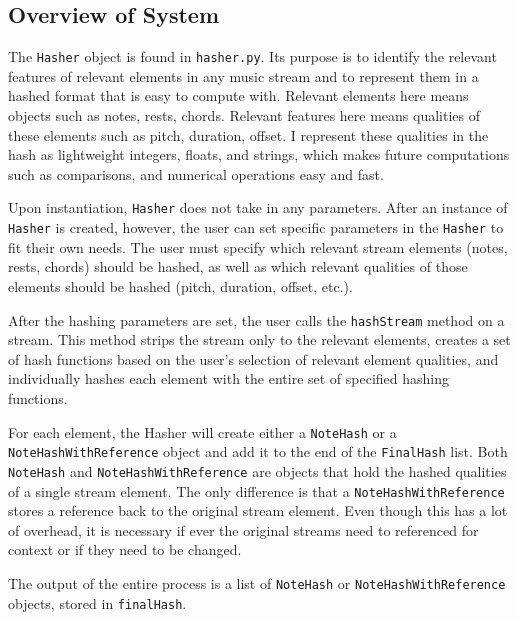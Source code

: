\subsection{Overview of System}
The \texttt{Hasher} object is found in \texttt{hasher.py}. Its purpose is to identify the relevant features of relevant elements in any music stream and to represent them in a hashed format that is easy to compute with. Relevant elements here means objects such as notes, rests, chords. Relevant features here means qualities of these elements such as pitch, duration, offset. I represent these qualities in the hash as lightweight integers, floats, and strings, which makes future computations such as comparisons, and numerical operations easy and fast. 

Upon instantiation, \texttt{Hasher} does not take in any parameters. After an instance of \texttt{Hasher} is created, however, the user can set specific parameters in the \texttt{Hasher} to fit their own needs. The user must specify which relevant stream elements (notes, rests, chords) should be hashed, as well as which relevant qualities of those elements should be hashed (pitch, duration, offset, etc.). 

After the hashing parameters are set, the user calls the \texttt{hashStream} method on a stream. This method strips the stream only to the relevant elements, creates a set of hash functions based on the user's selection of relevant element qualities, and individually hashes each element with the entire set of specified hashing functions. 

For each element, the Hasher will create either a \texttt{NoteHash} or a \texttt{NoteHashWithReference} object and add it to the end of the \texttt{FinalHash} list. Both \texttt{NoteHash} and \texttt{NoteHashWithReference} are objects that hold the hashed qualities of a single stream element. The only difference is that a \texttt{NoteHashWithReference} stores a reference back to the original stream element. Even though this has a lot of overhead, it is necessary if ever the original streams need to referenced for context or if they need to be changed.

The output of the entire process is a list of  \texttt{NoteHash} or \texttt{NoteHashWithReference} objects, stored in \texttt{finalHash}.

